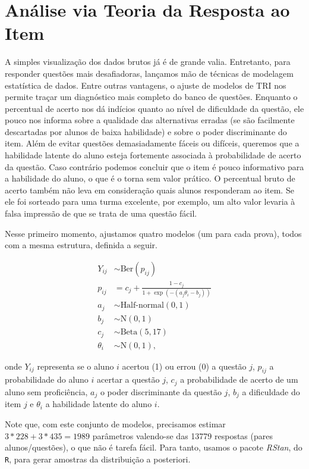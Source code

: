 \documentclass[a4paper]{report}
\begin{document}
\section{Análise via Teoria da Resposta ao Item} \label{sec:TRI}

A simples visualização dos dados brutos já é de grande valia.
Entretanto, para responder questões mais desafiadoras, lançamos mão de
técnicas de modelagem estatística de dados. Entre outras vantagens, o
ajuste de modelos de TRI nos permite traçar um diagnóstico mais completo
do banco de questões. Enquanto o percentual de acerto nos dá indícios
quanto ao nível de dificuldade da questão, ele pouco nos informa sobre a
qualidade das alternativas erradas (se são facilmente descartadas por
alunos de baixa habilidade) e sobre o poder discriminante do item. Além
de evitar questões demasiadamente fáceis ou difíceis, queremos que a
habilidade latente do aluno esteja fortemente associada à probabilidade
de acerto da questão. Caso contrário podemos concluir que o item é pouco
informativo para a habilidade do aluno, o que é o torna sem valor
prático. O percentual bruto de acerto também não leva em consideração
quais alunos responderam ao item. Se ele foi sorteado para uma turma
excelente, por exemplo, um alto valor levaria à falsa impressão de que
se trata de uma questão fácil.

Nesse primeiro momento, ajustamos quatro modelos (um para cada prova),
todos com a mesma estrutura, definida a seguir.

\begin{align*}
Y_{ij} & \sim \text{Ber}(p_{ij}) \\
p_{ij} & = c_j + \frac{1-c_j}{1+\exp(- (a_j\theta_i - b_j))} \\
a_j & \sim \text{Half-normal}(0, 1) \\
b_j & \sim \text{N}(0, 1) \\
c_j & \sim \text{Beta}(5, 17) \\
\theta_i & \sim \text{N}(0, 1),
\end{align*}

onde \(Y_{ij}\) representa se o aluno \(i\) acertou (1) ou errou (0) a
questão \(j\), \(p_{ij}\) a probabilidade do aluno \(i\) acertar a
questão \(j\), \(c_j\) a probabilidade de acerto de um aluno sem
proficiência, \(a_j\) o poder discriminante da questão \(j\), \(b_j\) a
dificuldade do item \(j\) e \(\theta_i\) a habilidade latente do aluno
\(i\).

Note que, com este conjunto de modelos, precisamos estimar
\(3*228 + 3*435 = 1989\) parâmetros valendo-se das 13779 respostas
(pares alunos/questões), o que não é tarefa fácil. Para tanto, usamos o
pacote \emph{RStan}, do \texttt{R}, para gerar amostras da distribuição
a posteriori.
\end{document}
